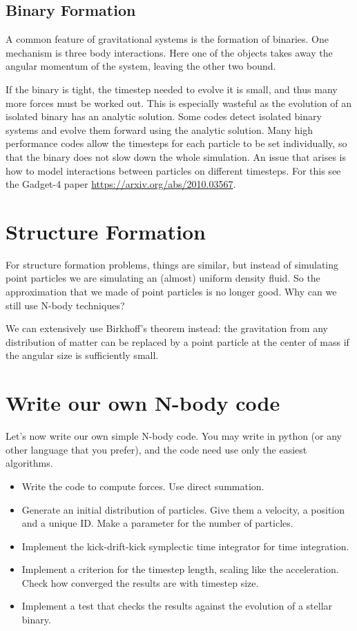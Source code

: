 \documentclass[12pt]{article}
\begin{document}
\subsection{Binary Formation}

A common feature of gravitational systems is the formation of binaries. One mechanism is three body interactions. Here one of the objects takes away the angular momentum of the system, leaving the other two bound.

If the binary is tight, the timestep needed to evolve it is small, and thus many more forces must be worked out. This is especially wasteful as the evolution of an isolated binary has an analytic solution. Some codes detect isolated binary systems and evolve them forward using the analytic solution. Many high performance codes allow the timesteps for each particle to be set individually, so that the binary does not slow down the whole simulation. An issue that arises is how to model interactions between particles on different timesteps. For this see the Gadget-4 paper \url{https://arxiv.org/abs/2010.03567}.

\section{Structure Formation}

For structure formation problems, things are similar, but instead of simulating point particles we are simulating an (almost) uniform density fluid. So the approximation that we made of point particles is no longer good. Why can we still use N-body techniques?

We can extensively use Birkhoff's theorem instead: the gravitation from any distribution of matter can be replaced by a point particle at the center of mass if the angular size is sufficiently small.

\section{Write our own N-body code}

Let's now write our own simple N-body code.
You may write in python (or any other language that you prefer), and the code need use only the easiest algorithms.

\begin{itemize}
 \item Write the code to compute forces. Use direct summation.
 \item Generate an initial distribution of particles. Give them a velocity, a position and a unique ID. Make a parameter for the number of particles.
 \item Implement the kick-drift-kick symplectic time integrator for time integration.
 \item Implement a criterion for the timestep length, scaling like the acceleration. Check how converged the results are with timestep size.
 \item Implement a test that checks the results against the evolution of a stellar binary.
\end{itemize}
\end{document}
